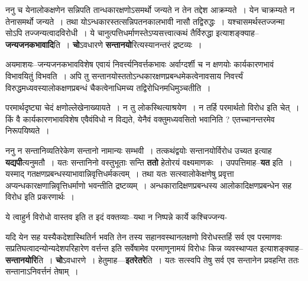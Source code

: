\documentclass[article,12pt,a4paper]{memoir}
\begin{document}
	  \pstart ननु च येनालोकक्षणेन सन्निपति  तान्धकारक्षणोऽसमर्थो जन्यते न तेन तद्देश आक्रम्यते । येन चाक्रम्यते न तेनासमर्थो जन्यते । तथा योऽन्धकारस्तत्सन्निपतनकालभावी नासौ तद्विरुद्धः । यश्चासमर्थस्तज्जन्मा सोऽपि तज्जन्यत्वादविरोधी । ये चानुत्पत्तिधर्माणस्तेऽप्यसत्त्वात्कथं तैर्विरुद्धा इत्याशङ्क्याह--\textbf{जन्यजनकभावादि}ति । \textbf{चो}ऽवधारणे \textbf{सन्तानयो}रित्यस्यानन्तरं द्रष्टव्यः ।
	\pend
      

	  \pstart अयमाशयः--जन्यजनकभावविशेष एवायं निवर्त्त्यनिवर्त्तकभावः अर्वाग्दर्शी च न क्षणयोः कार्यकारणभावं विभावयितुं विभवति । अपि तु सन्तानयोस्ततोऽन्धकारक्षणप्रबन्धमेकत्वेनावसाय निवर्त्त्यं विरुद्धमध्यवस्यालोकक्षणप्रबन्धं चैकत्वेनाधिमच्य तद्विरोधिनमधिमुञ्चतीति ।
	\pend
      

	  \pstart परमार्थदृष्ट्या चेदं क्षणोल्लेखेनाख्यायते । न तु लोकस्थित्याश्रयेण । न तर्हि परमार्थतो विरोध इति चेत् । किं वै कार्यकारणभावविशेष एवैवंविधो न विद्यते, येनैवं वक्तुमध्यवसितो भवानिति ? एतच्चानन्तरमेव निरूपयिष्यते ।
	\pend
      

	  \pstart ननु न सन्तानिव्यतिरेकेण सन्तानो नामान्यः सम्भवी । तत्कथं\leavevmode{}द्वयोः सन्तानयोर्विरोध उच्यत इत्याह \textbf{यद्यपी}त्यनुमतौ । यतः सन्तानिनो वस्तुभूताः सन्ति \textbf{ततो} हेतोरयं वक्ष्यमाणकः । उपपत्तिमाह--\textbf{यत} इति । यस्माद् गतक्षणप्रबन्धस्याभावान्निवृत्तिधर्मकत्वम् । तथा यतः सत्स्वालोकेक्षणेषु प्रवृत्ता अप्यन्धकारक्षणान्निवृत्तिधर्माणो भवन्तीति द्रष्टव्यम् । अन्धकारादिक्षणप्रबन्धस्य  आलोकादिक्षणप्रबन्धेन सह विरोध इति प्रकरणार्थः ।
	\pend
	  \bigskip
	  \begingroup
	

	  \pstart ये त्वाहुर्न विरोधो वास्तव इति त इदं वक्तव्याः--यथा न निष्पन्ने कार्ये कश्चिज्जन्य-
	\pend
      
	  \endgroup
	

	  \pstart यदि येन सह यस्यैकदेशास्थितिर्न भवति तेन तस्य सहानवस्थानलक्षणो विरोधस्तर्हि सर्व एव परमाणवः सप्रतिघत्वादन्योन्यदेशपरिहारेण वर्त्तन्त इति सर्वेषामेव परमाणूनामयं विरोधः किन्न व्यवस्थाप्यत इत्याशङ्क्याह--\textbf{सन्तानयोरि}ति । \textbf{चो}ऽवधारणे । हेतुमाह—\textbf{इतरेतरे}ति । यतः सत्स्वपि तेषु सर्व एव सन्तानेन प्रवहन्ति ततः सन्तानाऽनिवर्त्तनं तेषाम् ।
	\pend
      
\end{document}
